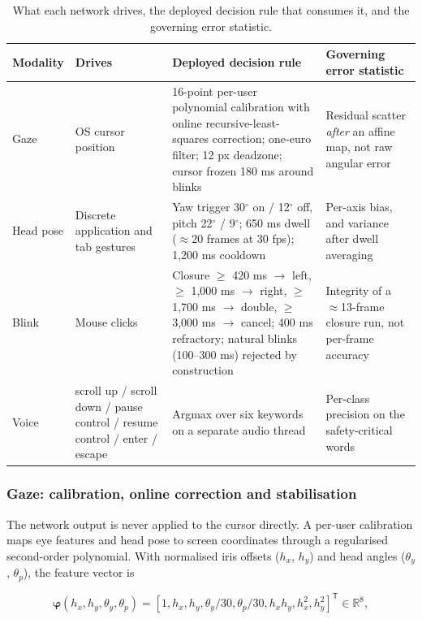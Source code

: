 \begin{table}[pos=htbp]
\centering
\caption{What each network drives, the deployed decision rule that consumes it, and the governing error statistic.}
\label{tab:6}
\footnotesize
\begin{tabularx}{\textwidth}{XXXX}
\toprule
\textbf{Modality} & \textbf{Drives} & \textbf{Deployed decision rule} & \textbf{Governing error statistic} \\
\midrule
Gaze & OS cursor position & 16-point per-user polynomial calibration with online recursive-least-squares correction; one-euro filter; 12 px deadzone; cursor frozen 180 ms around blinks & Residual scatter \emph{after} an affine map, not raw angular error \\
Head pose & Discrete application and tab gestures & Yaw trigger 30$^{\circ}$ on / 12$^{\circ}$ off, pitch 22$^{\circ}$ / 9$^{\circ}$; 650 ms dwell ($\approx$20 frames at 30 fps); 1,200 ms cooldown & Per-axis bias, and variance after dwell averaging \\
Blink & Mouse clicks & Closure $\geq$ 420 ms $\to$ left, $\geq$ 1,000 ms $\to$ right, $\geq$ 1,700 ms $\to$ double, $\geq$ 3,000 ms $\to$ cancel; 400 ms refractory; natural blinks (100--300 ms) rejected by construction & Integrity of a $\approx$13-frame closure run, not per-frame accuracy \\
Voice & scroll up / scroll down / pause control / resume control / enter / escape & Argmax over six keywords on a separate audio thread & Per-class precision on the safety-critical words \\
\bottomrule
\end{tabularx}
\end{table}

\subsubsection{Gaze: calibration, online correction and stabilisation}

The network output is never applied to the cursor directly. A per-user calibration maps eye features and head pose to screen coordinates through a regularised second-order polynomial. With normalised iris offsets ($h_{x}$, $h_{y}$) and head angles ($\theta_{y}$, $\theta_{p}$), the feature vector is

\begin{equation}
\label{eq:105}
\boldsymbol{\varphi}( h_x, h_y, \theta _y, \theta _p ) = [ 1, h_x, h_y, \theta _y/30, \theta _p/30, h_x h_y, h_x^{2}, h_y^{2} ]^{\mathsf{T}} \in \mathbb{R}^{8},
\end{equation}

